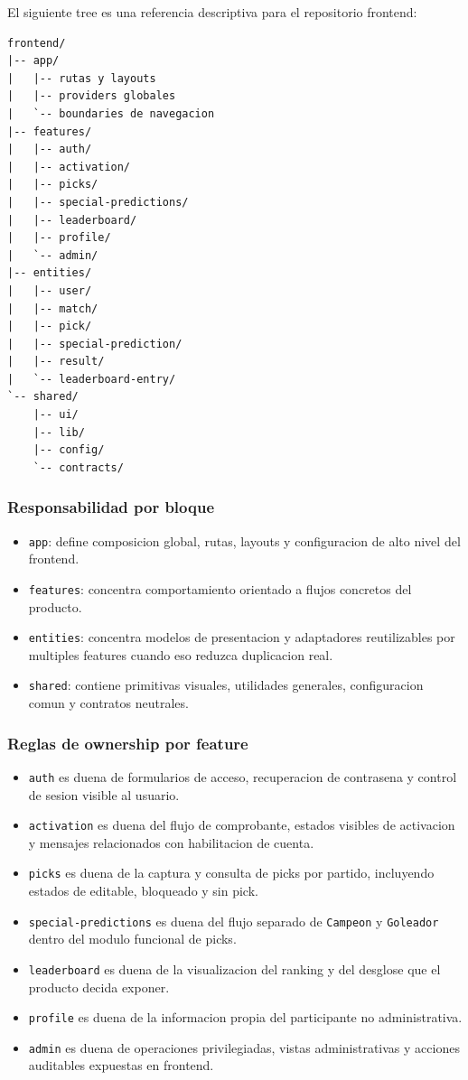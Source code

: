 El siguiente tree es una referencia descriptiva para el repositorio frontend:

\begin{verbatim}
frontend/
|-- app/
|   |-- rutas y layouts
|   |-- providers globales
|   `-- boundaries de navegacion
|-- features/
|   |-- auth/
|   |-- activation/
|   |-- picks/
|   |-- special-predictions/
|   |-- leaderboard/
|   |-- profile/
|   `-- admin/
|-- entities/
|   |-- user/
|   |-- match/
|   |-- pick/
|   |-- special-prediction/
|   |-- result/
|   `-- leaderboard-entry/
`-- shared/
    |-- ui/
    |-- lib/
    |-- config/
    `-- contracts/
\end{verbatim}

\subsubsection{Responsabilidad por bloque}

\begin{itemize}
  \item \texttt{app}: define composicion global, rutas, layouts y configuracion de alto nivel del frontend.
  \item \texttt{features}: concentra comportamiento orientado a flujos concretos del producto.
  \item \texttt{entities}: concentra modelos de presentacion y adaptadores reutilizables por multiples features cuando eso reduzca duplicacion real.
  \item \texttt{shared}: contiene primitivas visuales, utilidades generales, configuracion comun y contratos neutrales.
\end{itemize}

\subsubsection{Reglas de ownership por feature}

\begin{itemize}
  \item \texttt{auth} es duena de formularios de acceso, recuperacion de contrasena y control de sesion visible al usuario.
  \item \texttt{activation} es duena del flujo de comprobante, estados visibles de activacion y mensajes relacionados con habilitacion de cuenta.
  \item \texttt{picks} es duena de la captura y consulta de picks por partido, incluyendo estados de editable, bloqueado y sin pick.
  \item \texttt{special-predictions} es duena del flujo separado de \texttt{Campeon} y \texttt{Goleador} dentro del modulo funcional de picks.
  \item \texttt{leaderboard} es duena de la visualizacion del ranking y del desglose que el producto decida exponer.
  \item \texttt{profile} es duena de la informacion propia del participante no administrativa.
  \item \texttt{admin} es duena de operaciones privilegiadas, vistas administrativas y acciones auditables expuestas en frontend.
\end{itemize}

